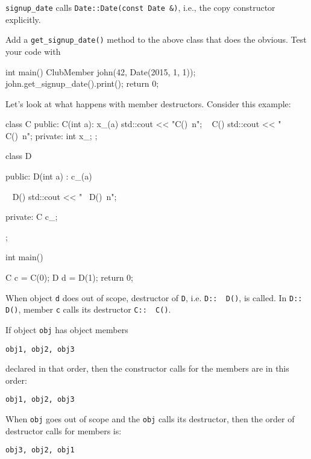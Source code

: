 \verb!signup_date! calls \verb!Date::Date(const Date &)!, i.e., the
copy constructor explicitly.

\begin{ex} Add a \verb!get_signup_date()! method to the above
class that does the obvious. Test your code with
\begin{console}
int main()
{   
    ClubMember john(42, Date(2015, 1, 1));
    john.get_signup_date().print();
    return 0;
}
\end{console}
\end{ex}
\newpage{}

Let's look at what happens with member destructors.
Consider this example:

\begin{console}
class C
{
public:
        C(int a): x_(a)
        {
             std::cout << "C()\ n";
        }
        ~ C()
        {
             std::cout << "~ C()\ n";
        }
private:
        int x_;
};

class D
{
public:
        D(int a)
            : c_(a)
        {}
        
        ~ D()
        {
            std::cout << "~ D()\ n";
        }
        
private:
        C c_;
};

int main()
{   
    C c = C(0);
    D d = D(1);
    return 0;

}
\end{console}

When object \texttt{d} does out of scope, destructor of \texttt{D}, i.e.
\texttt{D::~ D()}, is called. In
\texttt{D::~ D()}, member \texttt{c} calls its destructor
\texttt{C::~ C()}.

\newpage{}

If object \texttt{obj} has object members
\begin{center}
\texttt{obj1, obj2, obj3}
\end{center}
declared in that order, then the constructor calls for the members are
in this order:
\begin{center}
\texttt{obj1, obj2, obj3 }
\end{center}
When \texttt{obj} goes out of scope and the \texttt{obj} calls its
destructor, then the order of destructor calls for members is:
\begin{center}
\texttt{obj3, obj2, obj1}
\end{center}
\newpage{}

